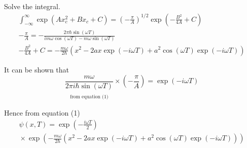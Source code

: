 \documentclass[12pt]{article}
\begin{document}
Solve the integral.
\begin{gather*}
\int_{-\infty}^\infty\exp(Ax_c^2+Bx_c+C)
=\left(-\frac{\pi}{A}\right)^{1/2}
\exp\left(-\frac{B^2}{4A}+C\right)
\\
-\frac{\pi}{A}
=-\frac{2\pi\hbar\sin(\omega T)}{im\omega\cos(\omega T)-m\omega\sin(\omega T)}
\tag{2}
\\
-\frac{B^2}{4A}+C
=-\frac{m\omega}{2\hbar}
\left(x^2-2ax\exp(-i\omega T)+a^2\cos(\omega T)\exp(-i\omega T)\right)
\tag{3}
\end{gather*}

It can be shown that
\begin{equation*}
\underset{\substack{\\[1ex]\text{from equation (1)}}}
{\frac{m\omega}{2\pi i\hbar\sin(\omega T)}}
\times
\left(-\frac{\pi}{A}\right)
=\exp(-i\omega T)
\tag{4}
\end{equation*}

Hence from equation (1)
\begin{multline*}
\psi(x,T)=\exp\left(-\frac{i\omega T}{2}\right)
\\
{}\times\exp\left(
-\frac{m\omega}{2\hbar}
\left(x^2-2ax\exp(-i\omega T)+a^2\cos(\omega T)\exp(-i\omega T)\right)
\right)
\end{multline*}
\end{document}
